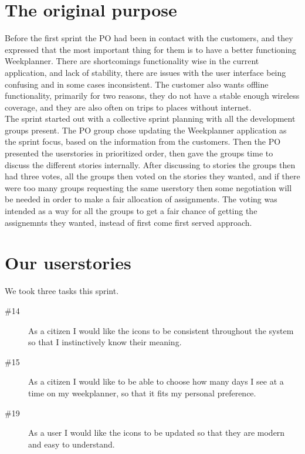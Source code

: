 \section{The original purpose}
Before the first sprint the \gls{PO} had been in contact with the customers, and they expressed that the most important thing for them is to have a better functioning Weekplanner.
There are shortcomings functionality wise  in the current application, and lack of stability, there are issues with the user interface being confusing and in some cases inconsistent. The customer also wants offline functionality, primarily for two reasons, they do not have a stable enough wireless coverage, and they are also often on trips to places without internet.
\\
The sprint started out with a collective sprint planning with all the development groups  present. The \gls{PO} group chose updating the Weekplanner application as the sprint focus, based on the information from the customers. Then the \gls{PO} presented the userstories in prioritized order, then gave the groups time to discuss the different stories internally. After discussing to stories the groups then had three votes, all the groups then voted on the stories they wanted, and if there were too many groups requesting the same userstory then some negotiation will be needed in order to make a fair allocation of assignments. The voting was intended as a way for all the groups to get a fair chance of getting the assignemnts they wanted, instead of first come first served approach.\newline

\section{Our userstories}
We took three tasks this sprint.
\begin{description}
    \item [\#14] As a citizen I would like the icons to be consistent throughout the system so that I instinctively know their meaning.
    \item [\#15] As a citizen I would like to be able to choose how many days I see at a time on my weekplanner, so that it fits my personal preference.
    \item [\#19] As a user I would like the icons to be updated so that they are modern and easy to understand.
\end{description}

